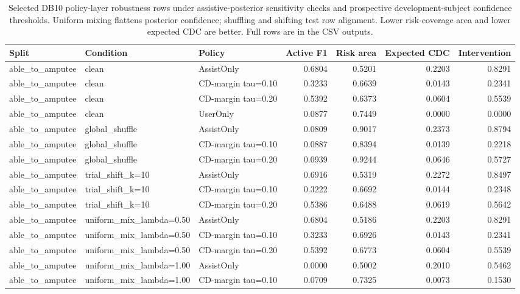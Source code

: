 \begin{table}[!t]
\centering
\caption{Selected DB10 policy-layer robustness rows under assistive-posterior sensitivity checks and prospective development-subject confidence thresholds. Uniform mixing flattens posterior confidence; shuffling and shifting test row alignment. Lower risk-coverage area and lower expected CDC are better. Full rows are in the CSV outputs.}
\label{tab:db10-policy-robustness}
\scriptsize
\setlength{\tabcolsep}{3pt}
\begin{tabular}{lllrrrr}
\toprule
Split & Condition & Policy & Active F1 & Risk area & Expected CDC & Intervention \\
\midrule
able\_to\_amputee & clean & AssistOnly & 0.6804 & 0.5201 & 0.2203 & 0.8291 \\
able\_to\_amputee & clean & CD-margin tau=0.10 & 0.3233 & 0.6639 & 0.0143 & 0.2341 \\
able\_to\_amputee & clean & CD-margin tau=0.20 & 0.5392 & 0.6373 & 0.0604 & 0.5539 \\
able\_to\_amputee & clean & UserOnly & 0.0877 & 0.7449 & 0.0000 & 0.0000 \\
able\_to\_amputee & global\_shuffle & AssistOnly & 0.0809 & 0.9017 & 0.2373 & 0.8794 \\
able\_to\_amputee & global\_shuffle & CD-margin tau=0.10 & 0.0887 & 0.8394 & 0.0139 & 0.2218 \\
able\_to\_amputee & global\_shuffle & CD-margin tau=0.20 & 0.0939 & 0.9244 & 0.0646 & 0.5727 \\
able\_to\_amputee & trial\_shift\_k=10 & AssistOnly & 0.6916 & 0.5319 & 0.2272 & 0.8497 \\
able\_to\_amputee & trial\_shift\_k=10 & CD-margin tau=0.10 & 0.3222 & 0.6692 & 0.0144 & 0.2348 \\
able\_to\_amputee & trial\_shift\_k=10 & CD-margin tau=0.20 & 0.5386 & 0.6488 & 0.0619 & 0.5642 \\
able\_to\_amputee & uniform\_mix\_lambda=0.50 & AssistOnly & 0.6804 & 0.5186 & 0.2203 & 0.8291 \\
able\_to\_amputee & uniform\_mix\_lambda=0.50 & CD-margin tau=0.10 & 0.3233 & 0.6926 & 0.0143 & 0.2341 \\
able\_to\_amputee & uniform\_mix\_lambda=0.50 & CD-margin tau=0.20 & 0.5392 & 0.6773 & 0.0604 & 0.5539 \\
able\_to\_amputee & uniform\_mix\_lambda=1.00 & AssistOnly & 0.0000 & 0.5002 & 0.2010 & 0.5462 \\
able\_to\_amputee & uniform\_mix\_lambda=1.00 & CD-margin tau=0.10 & 0.0709 & 0.7325 & 0.0073 & 0.1530 \\

\end{tabular}
\end{table}
